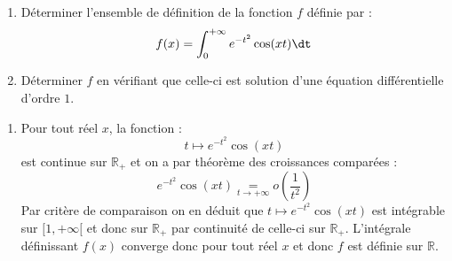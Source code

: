 \documentclass[a4paper,10pt]{report}
\begin{document}
\begin{Exa}
\begin{enumerate}
\item Déterminer l'ensemble de définition de la fonction $f$ définie par :
$$ f(x) = \int_{0}^{+ \infty} e^{-t^2} \cos(xt) \dt$$
\item Déterminer $f$ en vérifiant que celle-ci est solution d'une équation différentielle d'ordre $1$.
\end{enumerate}
\end{Exa}

\corr \begin{enumerate}
\item Pour tout réel $x$, la fonction :
$$t \mapsto e^{-t^2} \cos(xt)$$
est continue sur $\mathbb{R}_+$ et on a par théorème des croissances comparées :
$$ e^{-t^2} \cos(xt)  \underset{t \rightarrow + \infty}{=} o \left( \dfrac{1}{t^2} \right)$$
Par critère de comparaison on en déduit que $t \mapsto e^{-t^2} \cos(xt)$ est intégrable sur $[1, + \infty[$ et donc sur $\mathbb{R}_+$ par continuité de celle-ci sur $\mathbb{R}_+$. L'intégrale définissant $f(x)$ converge donc pour tout réel $x$ et donc $f$ est définie sur $\mathbb{R}$.


\end{enumerate}
\end{document}
